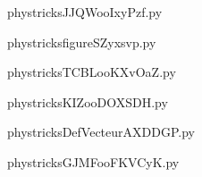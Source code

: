     \newcommand{\CaptionFigJJQWooIxyPzf}{<+Type your caption here+>}
    \begin{center}
        
    \end{center}
    phystricksJJQWooIxyPzf.py

    

    \clearpage
    


    \newcommand{\CaptionFigfigureSZyxsvp}{<+Type your caption here+>}
    \begin{center}
        
    \end{center}
    phystricksfigureSZyxsvp.py

    

    \clearpage
    


    \newcommand{\CaptionFigTCBLooKXvOaZ}{<+Type your caption here+>}
    \begin{center}
        
    \end{center}
    phystricksTCBLooKXvOaZ.py

    

    \clearpage
    


    \newcommand{\CaptionFigKIZooDOXSDH}{<+Type your caption here+>}
    \begin{center}
        
    \end{center}
    phystricksKIZooDOXSDH.py

    

    \clearpage
    


    \newcommand{\CaptionFigDefVecteurAXDDGP}{<+Type your caption here+>}
    \begin{center}
        
    \end{center}
    phystricksDefVecteurAXDDGP.py

    

    \clearpage
    


    \newcommand{\CaptionFigGJMFooFKVCyK}{<+Type your caption here+>}
    \begin{center}
        
    \end{center}
    phystricksGJMFooFKVCyK.py

